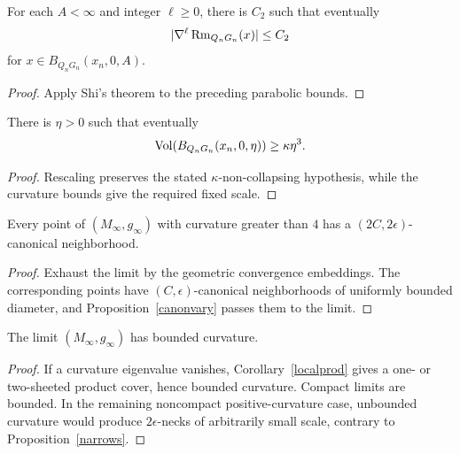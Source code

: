 \begin{corollary}
\label{cor:shi-bound-blowup-sequence}

For each $A<\infty$ and integer $\ell\ge0$, there is $C_2$ such that
eventually
$$|\nabla^\ell\operatorname{Rm}_{Q_nG_n}(x)|\le C_2$$
for $x\in B_{Q_nG_n}(x_n,0,A)$.
\end{corollary}
\begin{proof}\sketch Apply Shi's theorem to the preceding parabolic bounds.\end{proof}

\begin{claim}
\label{claim:volume-noncollapsing-blowup}
There is $\eta>0$ such that eventually
$$\operatorname{Vol}(B_{Q_nG_n}(x_n,0,\eta))\ge\kappa\eta^3.$$
\end{claim}
\begin{proof}\sketch Rescaling preserves the stated $\kappa$-non-collapsing
hypothesis, while the curvature bounds give the required fixed scale.\end{proof}

\begin{claim}
\label{claim:canonical-neighborhood-persists}

Every point of $(M_\infty,g_\infty)$ with curvature greater than $4$ has a
$(2C,2\epsilon)$-canonical neighborhood.
\end{claim}
\begin{proof}
\sketch Exhaust the limit by the geometric convergence embeddings. The
corresponding points have $(C,\epsilon)$-canonical neighborhoods of uniformly
bounded diameter, and Proposition~\ref{canonvary} passes them to the limit.\end{proof}

\begin{claim}
\label{claim:limit-bounded-curvature}
The limit $(M_\infty,g_\infty)$ has bounded curvature.
\end{claim}
\begin{proof}
\sketch If a curvature eigenvalue vanishes, Corollary~\ref{localprod} gives a
one- or two-sheeted product cover, hence bounded curvature. Compact limits are
bounded. In the remaining noncompact positive-curvature case, unbounded
curvature would produce $2\epsilon$-necks of arbitrarily small scale, contrary
to Proposition~\ref{narrows}.\end{proof}

